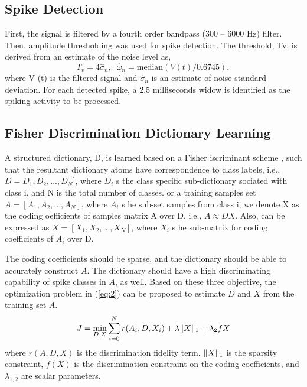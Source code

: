 \documentclass[conference]{IEEEtran}
\begin{document}
	\subsection{Spike Detection}
	First, the signal is filtered by a fourth order bandpass (300 – 6000 Hz) filter. Then, amplitude thresholding was used for spike detection. The threshold, Tv, is derived from an estimate of the noise level \cite{quiroga2004unsupervised} as,
	\begin{equation}
		\label{eq:1}
		T_v=4\hat{\sigma}_n,\;\;\hat{\omega}_n=\mathrm{median}(V(t)/0.6745),
	\end{equation}
	where V (t) is the filtered signal and $\hat{\sigma}_n$ is an estimate of noise standard deviation. For each detected spike, a 2.5 milliseconds widow is identified as the spiking activity to be processed.
	
	\subsection{Fisher Discrimination Dictionary Learning}
	A structured dictionary, D, is learned based on a Fisher iscriminant scheme \cite{yang2011fisher}, such that the resultant dictionary atoms have correspondence to class labels, i.e., $D = D_1, D_2, ..., D_N]$, where $D_i$ s the class specific sub-dictionary sociated with class i, and N is the total number of classes. or a training samples set $A = [A_1, A_2, ..., A_N]$, where $A_i$ s he sub-set samples from class i, we denote X as the coding oefficients of samples matrix A over D, i.e., $A \approx DX$. Also,  can be expressed as $X = [X_1, X_2, ..., X_N]$, where $X_i$ s he sub-matrix for coding coefficients of $A_i$ over D.
	
	The coding coefficients should be sparse, and the dictionary should be able to accurately construct $A$. The dictionary should have a high discriminating capability of spike classes in $A$, as well. Based on these three objective, the optimization problem in (\ref{eq:2}) can be proposed to estimate $D$ and $X$ from the training set $A$.
	\begin{equation}
		\label{eq:2}
		J=\min_{D,X}\sum_{i=0}^{N}r(A_i,D,X_i)+\lambda\Vert{X}\Vert_1+\lambda_2f{X}
	\end{equation}
	where $r(A, D, X)$ is the discrimination fidelity term, $\Vert{X}\Vert_1$ is the sparsity constraint, $f(X)$ is the discrimination constraint on the coding coefficients, and $\lambda_{1,2}$ are scalar parameters.
	
\end{document}
